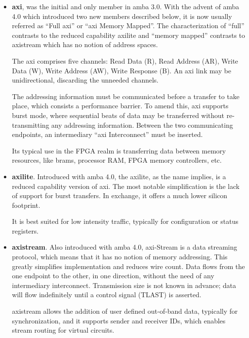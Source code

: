 \begin{itemize}
\item	\textbf{\gls{axi}}, was the initial and only member in \gls{amba} 3.0. 
	With the advent of \gls{amba} 4.0 which introduced
	two new members described below, it is now usually 
	referred as ``Full \gls{axi}'' or ``\gls{axi} Memory Mapped''.
	The characterization of ``full'' contrasts to 
	the reduced capability \gls{axilite} and ``memory mapped''
	contrasts to \gls{axistream} which has no notion of address spaces.

	The \gls{axi} comprises five channels: Read Data (R), Read Address (AR),
	Write Data (W), Write Address (AW), Write Response (B). An \gls{axi} link
	may be unidirectional, discarding the unneeded channels.

	The addressing information must be communicated before a transfer to take place, 
	which consists a performance barrier. 
	To amend this, \gls{axi} supports \gls{burst} mode, 
	where sequential \glspl{beat} of data may be transferred without 
	re-transmitting any addressing information.
	Between the two communicating endpoints, 
	an intermediary ``\gls{axi} Interconnect'' must be inserted.

	Its typical use in the FPGA realm is transferring data between memory resources,
 	like \glspl{bram}, processor RAM, FPGA memory controllers, etc.

\item	\textbf{\gls{axilite}}. Introduced with \gls{amba} 4.0, 
	the \gls{axilite}, as the  name implies,
	is a reduced capability version of \gls{axi}. 
	The most notable simplification is the 
	lack of support for \gls{burst} transfers. 
	In exchange, it offers a much lower silicon footprint. 
	
	It is best suited for low intensity traffic, 
	typically for configuration or status registers.

\item	\textbf{\gls{axistream}}. Also introduced with \gls{amba} 4.0, 
	\gls{axi}-Stream is a data streaming protocol,
	which means that it has no notion of memory addressing.
	This greatly simplifies implementation and reduces wire count.
	Data flows from the one endpoint to the other, in one direction, 
	without the need of any intermediary interconnect.
	Transmission size is not known in advance; data will flow
	indefinitely until a control signal (TLAST) is asserted.

	\gls{axistream} allows the addition of user defined out-of-band data,
	typically for synchronization, and it supports sender and receiver IDs, 
	which enables stream routing for virtual circuits.
\end{itemize}


